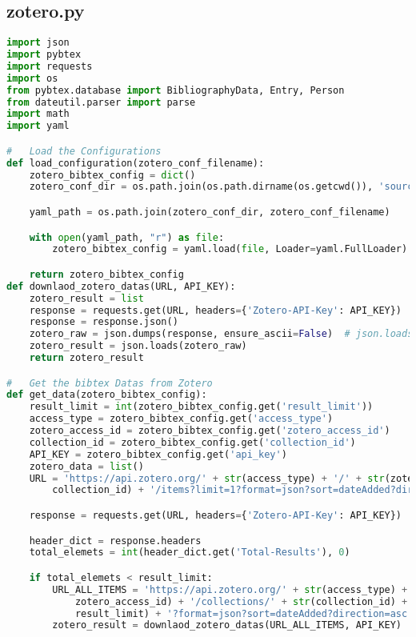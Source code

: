 
\subsection{zotero.py}
\lstset{style=gra_codestyle}
\begin{lstlisting}[language=python, caption=Python LaTex - zotero.py - Zotero BibLaTex Importer,captionpos=b,label={lst:zotero},breaklines=true]
import json
import pybtex
import requests
import os
from pybtex.database import BibliographyData, Entry, Person
from dateutil.parser import parse
import math
import yaml

#   Load the Configurations
def load_configuration(zotero_conf_filename):
    zotero_bibtex_config = dict()
    zotero_conf_dir = os.path.join(os.path.dirname(os.getcwd()), 'source', 'configuration')

    yaml_path = os.path.join(zotero_conf_dir, zotero_conf_filename)

    with open(yaml_path, "r") as file:
        zotero_bibtex_config = yaml.load(file, Loader=yaml.FullLoader)

    return zotero_bibtex_config
def downlaod_zotero_datas(URL, API_KEY):
    zotero_result = list
    response = requests.get(URL, headers={'Zotero-API-Key': API_KEY})
    response = response.json()
    zotero_raw = json.dumps(response, ensure_ascii=False)  # json.loads(response)
    zotero_result = json.loads(zotero_raw)
    return zotero_result

#   Get the bibtex Datas from Zotero
def get_data(zotero_bibtex_config):
    result_limit = int(zotero_bibtex_config.get('result_limit'))
    access_type = zotero_bibtex_config.get('access_type')
    zotero_access_id = zotero_bibtex_config.get('zotero_access_id')
    collection_id = zotero_bibtex_config.get('collection_id')
    API_KEY = zotero_bibtex_config.get('api_key')
    zotero_data = list()
    URL = 'https://api.zotero.org/' + str(access_type) + '/' + str(zotero_access_id) + '/collections/' + str(
        collection_id) + '/items?limit=1?format=json?sort=dateAdded?direction=asc'

    response = requests.get(URL, headers={'Zotero-API-Key': API_KEY})

    header_dict = response.headers
    total_elemets = int(header_dict.get('Total-Results'), 0)

    if total_elemets < result_limit:
        URL_ALL_ITEMS = 'https://api.zotero.org/' + str(access_type) + '/' + str(
            zotero_access_id) + '/collections/' + str(collection_id) + '/items?limit=' + str(
            result_limit) + '?format=json?sort=dateAdded?direction=asc'
        zotero_result = downlaod_zotero_datas(URL_ALL_ITEMS, API_KEY)


\end{lstlisting}
